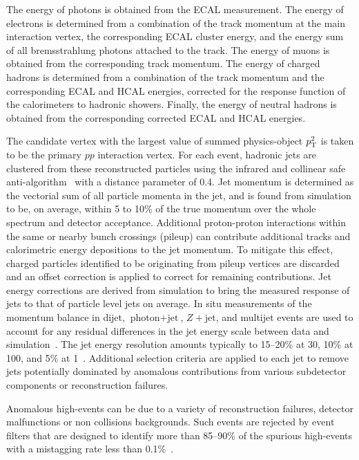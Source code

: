 The energy of photons is obtained from the ECAL measurement. The energy of electrons is determined from a combination of the track momentum at the main interaction vertex, the corresponding ECAL cluster energy, and the energy sum of all bremsstrahlung photons attached to the track. The energy of muons is obtained from the corresponding track momentum. The energy of charged hadrons is determined from a combination of the track momentum and the corresponding ECAL and HCAL energies, corrected for the response function of the calorimeters to hadronic showers. Finally, the energy of neutral hadrons is obtained from the corresponding corrected ECAL and HCAL energies.

The candidate vertex with the largest value of summed physics-object $p_{\mathrm{T}}^2$ is taken to be the primary $pp$ interaction vertex. For each event, hadronic jets are clustered from these reconstructed particles using the infrared and collinear safe anti-\kt algorithm~\cite{Cacciari:2008gp, Cacciari:2011ma} with a distance parameter of 0.4. Jet momentum is determined as the vectorial sum of all particle momenta in the jet, and is found from simulation to be, on average, within 5 to 10\% of the true momentum over the whole \pt spectrum and detector acceptance. Additional proton-proton interactions within the same or nearby bunch crossings (pileup) can contribute additional tracks and calorimetric energy depositions to the jet momentum. To mitigate this effect, charged particles identified to be originating from pileup vertices are discarded and an offset correction is applied to correct for remaining contributions. Jet energy corrections are derived from simulation to bring the measured response of jets to that of particle level jets on average. In situ measurements of the momentum balance in dijet, $\text{photon} + \text{jet}$, $Z + \text{jet}$, and multijet events are used to account for any residual differences in the jet energy scale between data and simulation~\cite{Khachatryan:2016kdb}. The jet energy resolution amounts typically to 15--20\% at 30\GeV, 10\% at 100\GeV, and 5\% at 1\TeV~\cite{Khachatryan:2016kdb}. Additional selection criteria are applied to each jet to remove jets potentially dominated by anomalous contributions from various subdetector components or reconstruction failures.

Anomalous high-\ptmiss events can be due to a variety of reconstruction failures, detector malfunctions or non collisions backgrounds. Such events are rejected by event filters that are designed to identify more than 85--90\% of the spurious high-\ptmiss events with a mistagging rate less than 0.1\%~\cite{Sirunyan:2019kia}.

